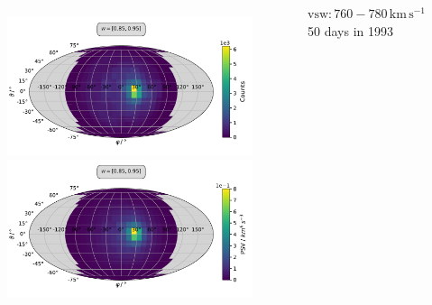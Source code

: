 \documentclass{beamer}
\begin{document}
%
%
%
\begin{frame}[plain]{}
\begin{columns}
	\column{7.5cm}
	\begin{figure}
			\includegraphics[scale=.4]{Pics/sky_counts.pdf}
		\includegraphics[scale=.4]{Pics/sky_norm.pdf}
		\end{figure}

	\column{2.5cm}
	\vspace{8cm}
	 {\tiny $\mathrm{vsw}:760 - 780 \, \mathrm{km\,s^{-1}}$ \\
		50 days in 1993}
	
	\end{columns}


\end{frame}
\end{document}
